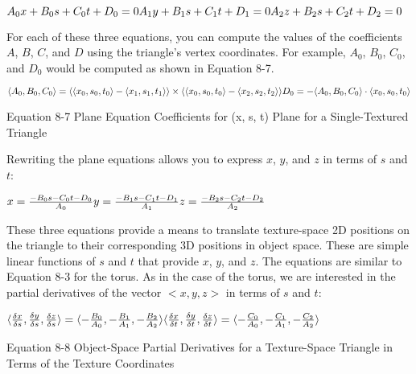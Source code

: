 \documentclass[../main.tex]{subfiles}
\begin{document}
\FloatBarrier
$
A_0x+B_0s+C_0t+D_0=0 \newline
A_1y+B_1s+C_1t+D_1=0 \newline
A_2z+B_2s+C_2t+D_2=0
$
\FloatBarrier

For each of these three equations, you can compute the values of the coefficients $A$, $B$, $C$, and $D$ using the triangle's vertex coordinates. For example, $A_0$, $B_0$, $C_0$, and $D_0$ would be computed as shown in Equation 8-7.

\FloatBarrier
\begin{equationcaption}
$
\langle A_0,B_0,C_0\rangle =\langle \langle x_0,s_0,t_0\rangle -\langle x_1,s_1,t_1\rangle \rangle \times \langle \langle x_0,s_0,t_0\rangle -\langle x_2,s_2,t_2\rangle \rangle \newline
D_0=-\langle A_0,B_0,C_0\rangle \cdot \langle x_0,s_0,t_0\rangle
$
\caption{Equation 8-7 Plane Equation Coefficients for (x, s, t) Plane for a Single-Textured Triangle}
\end{equationcaption}
\FloatBarrier

Rewriting the plane equations allows you to express $x$, $y$, and $z$ in terms of $s$ and $t$:

\FloatBarrier
$
x=\frac{-B_0s-C_0t-D_0}{A_0} \newline
y=\frac{-B_1s-C_1t-D_1}{A_1} \newline
z=\frac{-B_2s-C_2t-D_2}{A_2}
$
\FloatBarrier

These three equations provide a means to translate texture-space 2D positions on the triangle to their corresponding 3D positions in object space. These are simple linear functions of $s$ and $t$ that provide $x$, $y$, and $z$. The equations are similar to Equation 8-3 for the torus. As in the case of the torus, we are interested in the partial derivatives of the vector $<x, y, z>$ in terms of $s$ and $t$:

\FloatBarrier
\begin{equationcaption}
$
\langle \frac{\delta x}{\delta s},\frac{\delta y}{\delta s},\frac{\delta z}{\delta s}\rangle = \langle -\frac{B_0}{A_0},-\frac{B_1}{A_1},-\frac{B_2}{A_2}\rangle \newline
\langle \frac{\delta x}{\delta t},\frac{\delta y}{\delta t},\frac{\delta z}{\delta t}\rangle = \langle -\frac{C_0}{A_0},-\frac{C_1}{A_1},-\frac{C_2}{A_2}\rangle \newline
$
\caption{Equation 8-8 Object-Space Partial Derivatives for a Texture-Space Triangle in Terms of the Texture Coordinates}
\end{equationcaption}
\FloatBarrier
\end{document}
